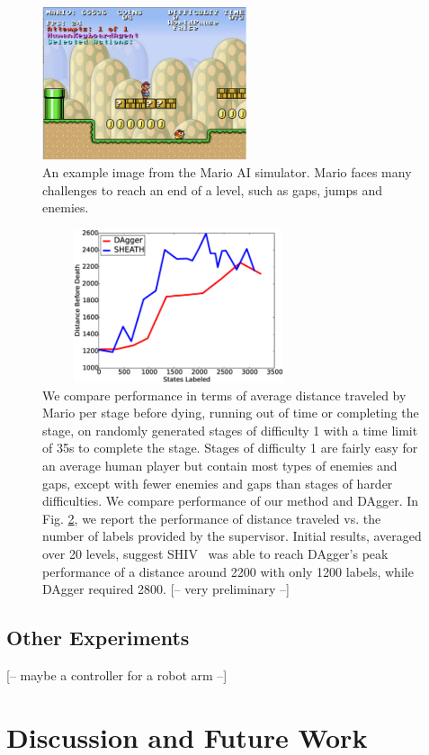 \documentclass[10pt, conference]{ieeeconf}      %
\newcommand{\acro}{SHIV}
\begin{document}
\begin{figure}[t!]
\centering
\includegraphics[width = 6cm ]{figures/mario.png}
\caption{ An example image from the Mario AI simulator. Mario faces many challenges to reach an end of a level, such as gaps, jumps and enemies.  }

\vspace*{-10pt}
\label{fig:dis_traveled}
\end{figure}



\begin{figure}[ht]
\centering

\includegraphics[width=8cm, height = 4.5cm]{figures/dagger_sheath_mario.eps}


\caption{We compare performance in terms of average distance traveled by Mario per stage before dying, running out of
time or completing the stage, on randomly generated stages of difficulty 1 with a time limit of 35s to complete the
stage.  Stages of difficulty 1 are fairly easy for an average human player but contain most types of enemies and gaps,
except with fewer enemies and gaps than stages of harder difficulties. We compare performance of our method and DAgger.
In Fig. \ref{fig:mario_results}, we report the performance of distance traveled vs. the number of labels provided by the
supervisor. Initial results, averaged over 20 levels, suggest \acro~ was able to reach DAgger's peak performance of a
distance around 2200 with only 1200 labels, while DAgger required 2800. {\color{blue} [-- very preliminary --]}}
\label{fig:mario_results}
\end{figure}


\subsection{Other Experiments}
{\color{blue} [-- maybe a controller for a robot arm --]}

\section{Discussion and Future Work}




\end{document}
